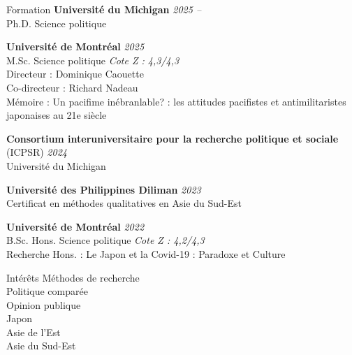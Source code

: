 \documentclass{resume} %
\begin{document}

\begin{rSection}{Formation}
{\bf Université du Michigan} \hfill {\em 2025 -- }
\\ Ph.D. Science politique

{\bf Université de Montréal} \hfill {\em 2025} 
\\ M.Sc. Science politique \hfill {\em Cote Z : 4,3/4,3}
\\ Directeur : Dominique Caouette 
\\ Co-directeur : Richard Nadeau
\\ Mémoire : Un pacifime inébranlable? : les attitudes pacifistes et antimilitaristes japonaises au 21e siècle

{\bf Consortium interuniversitaire pour la recherche politique et sociale} (ICPSR) \hfill {\em 2024} 
\\Université du Michigan \hfill 

{\bf Université des Philippines Diliman} \hfill {\em 2023} 
\\ Certificat en méthodes qualitatives en Asie du Sud-Est\hfill 

{\bf Université de Montréal} \hfill {\em 2022}
\\ B.Sc. Hons. Science politique \hfill {\em Cote Z : 4,2/4,3}
\\ Recherche Hons. : Le Japon et la Covid-19 : Paradoxe et Culture

\end{rSection}


\begin{rSection}{Intérêts}
Méthodes de recherche
\\ Politique comparée
\\ Opinion publique
\\ Japon
\\ Asie de l'Est
\\ Asie du Sud-Est
\end{rSection}
\end{document}
